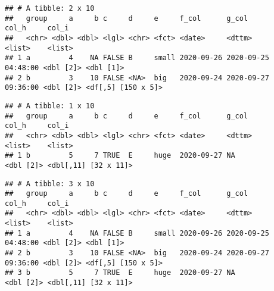 \documentclass[
]{book}
\newenvironment{Shaded}{\begin{snugshade}}{\end{snugshade}}
\newcommand{\DecValTok}[1]{\textcolor[rgb]{0.00,0.00,0.81}{#1}}
\newcommand{\KeywordTok}[1]{\textcolor[rgb]{0.13,0.29,0.53}{\textbf{#1}}}
\newcommand{\NormalTok}[1]{#1}
\newcommand{\OperatorTok}[1]{\textcolor[rgb]{0.81,0.36,0.00}{\textbf{#1}}}
\newcommand{\StringTok}[1]{\textcolor[rgb]{0.31,0.60,0.02}{#1}}
\begin{document}
\begin{Shaded}
\end{Shaded}

\begin{verbatim}
## # A tibble: 2 x 10
##   group     a     b c     d     e     f_col      g_col               col_h     col_i             
##   <chr> <dbl> <dbl> <lgl> <chr> <fct> <date>     <dttm>              <list>    <list>            
## 1 a         4    NA FALSE B     small 2020-09-26 2020-09-25 04:48:00 <dbl [2]> <dbl [1]>         
## 2 b         3    10 FALSE <NA>  big   2020-09-24 2020-09-27 09:36:00 <dbl [2]> <df[,5] [150 x 5]>
\end{verbatim}

\begin{Shaded}
\end{Shaded}

\begin{verbatim}
## # A tibble: 1 x 10
##   group     a     b c     d     e     f_col      g_col               col_h     col_i               
##   <chr> <dbl> <dbl> <lgl> <chr> <fct> <date>     <dttm>              <list>    <list>              
## 1 b         5     7 TRUE  E     huge  2020-09-27 NA                  <dbl [2]> <dbl[,11] [32 x 11]>
\end{verbatim}

\begin{Shaded}
\end{Shaded}

\begin{verbatim}
## # A tibble: 3 x 10
##   group     a     b c     d     e     f_col      g_col               col_h     col_i               
##   <chr> <dbl> <dbl> <lgl> <chr> <fct> <date>     <dttm>              <list>    <list>              
## 1 a         4    NA FALSE B     small 2020-09-26 2020-09-25 04:48:00 <dbl [2]> <dbl [1]>           
## 2 b         3    10 FALSE <NA>  big   2020-09-24 2020-09-27 09:36:00 <dbl [2]> <df[,5] [150 x 5]>  
## 3 b         5     7 TRUE  E     huge  2020-09-27 NA                  <dbl [2]> <dbl[,11] [32 x 11]>
\end{verbatim}
\end{document}
